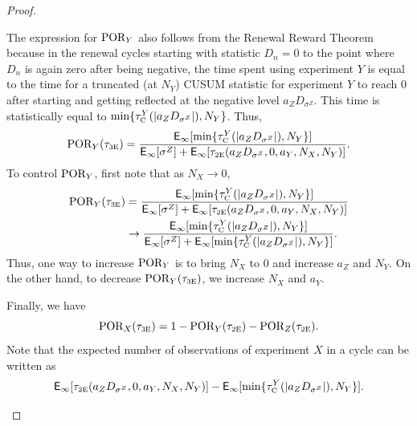 \documentclass[journal, onecolumn]{IEEEtran}
\begin{document}
\begin{proof}
\begin{enumerate}
The expression for $\textup{POR}_Y$ also follows from the Renewal Reward Theorem because in the renewal cycles starting with statistic $D_n=0$ to the point where $D_n$ is again zero after being negative, the time spent using experiment $Y$ is equal to the time for a truncated (at $N_Y$) CUSUM statistic for experiment $Y$ to reach $0$ after starting and getting reflected at the negative level $a_Z D_{\sigma^Z}$. This time is statistically equal to $\min \{ \tau_{\textup{\fontsize{6 pt}{10 pt}\selectfont C}}^Y (\vert a_Z D_{\sigma^Z} \vert), N_Y \}$. Thus,
\begin{align*}
 \textup{POR}_Y (\tau_{\textup{\fontsize{6 pt}{10 pt}\selectfont 3E}}) = \frac{\mathsf{E}_\infty [\min \{ \tau_{\textup{\fontsize{6 pt}{10 pt}\selectfont C}}^Y (\vert a_Z D_{\sigma^Z} \vert), N_Y \}]}{\mathsf{E}_\infty [\sigma^Z] + \mathsf{E}_\infty [\tau_{\textup{\fontsize{6 pt}{10 pt}\selectfont 2E}}(a_Z D_{\sigma^Z}, 0, a_Y, N_X, N_Y)]}.
\end{align*}
To control $\textup{POR}_Y$, first note that as $N_X \to 0$,
\begin{align*}
 \textup{POR}_Y (\tau_{\textup{\fontsize{6 pt}{10 pt}\selectfont 3E}}) &= \frac{\mathsf{E}_\infty [\min \{ \tau_{\textup{\fontsize{6 pt}{10 pt}\selectfont C}}^Y (\vert a_Z D_{\sigma^Z} \vert), N_Y \}]}{\mathsf{E}_\infty [\sigma^Z] + \mathsf{E}_\infty [\tau_{\textup{\fontsize{6 pt}{10 pt}\selectfont 2E}}(a_Z D_{\sigma^Z}, 0, a_Y, N_X, N_Y)]} \\
& \to \frac{\mathsf{E}_\infty [\min \{ \tau_{\textup{\fontsize{6 pt}{10 pt}\selectfont C}}^Y (\vert a_Z D_{\sigma^Z} \vert), N_Y \}]}{\mathsf{E}_\infty [\sigma^Z] + \mathsf{E}_\infty [\min \{ \tau_{\textup{\fontsize{6 pt}{10 pt}\selectfont C}}^Y (\vert a_Z D_{\sigma^Z} \vert), N_Y \}]}.
\end{align*}
Thus, one way to increase $\textup{POR}_Y$ is to bring $N_X$ to $0$ and increase $a_Z$ and $N_Y$. On the other hand, to decrease $\textup{POR}_Y (\tau_{\textup{\fontsize{6 pt}{10 pt}\selectfont 3E}})$, we increase $N_X$ and $a_Y$. 

\medskip

Finally, we have
$$ \textup{POR}_X (\tau_{\textup{\fontsize{6 pt}{10 pt}\selectfont 3E}}) = 1 - \textup{POR}_Y (\tau_{\textup{\fontsize{6 pt}{10 pt}\selectfont 2E}}) - \textup{POR}_Z (\tau_{\textup{\fontsize{6 pt}{10 pt}\selectfont 2E}}). $$
Note that the expected number of observations of experiment $X$ in a cycle can be written as
\begin{align*}
 \mathsf{E}_\infty [\tau_{\textup{\fontsize{6 pt}{10 pt}\selectfont 2E}}(a_Z D_{\sigma^Z}, 0, a_Y, N_X, N_Y)]  - \mathsf{E}_\infty [\min \{ \tau_{\textup{\fontsize{6 pt}{10 pt}\selectfont C}}^Y (\vert a_Z D_{\sigma^Z} \vert), N_Y \}].
\end{align*}


\end{enumerate}
\end{proof}
\end{document}
